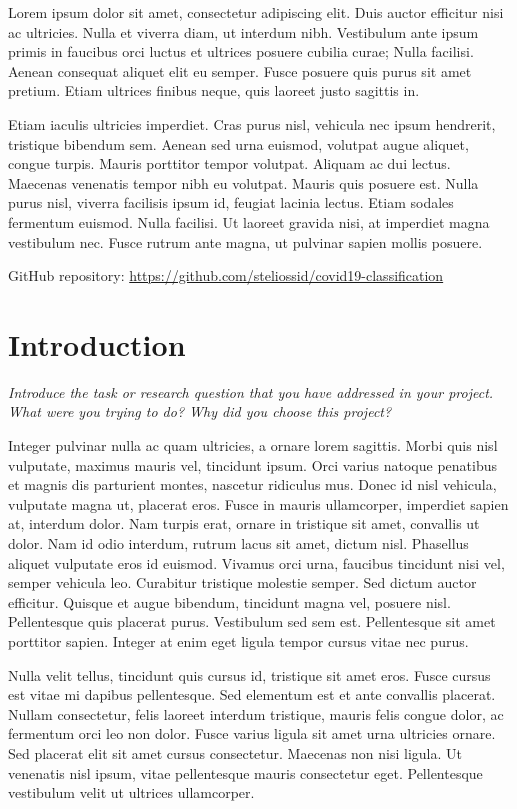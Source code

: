 \documentclass[
]{article}
\begin{document}
Lorem ipsum dolor sit amet, consectetur adipiscing elit. Duis auctor
efficitur nisi ac ultricies. Nulla et viverra diam, ut interdum nibh.
Vestibulum ante ipsum primis in faucibus orci luctus et ultrices posuere
cubilia curae; Nulla facilisi. Aenean consequat aliquet elit eu semper.
Fusce posuere quis purus sit amet pretium. Etiam ultrices finibus neque,
quis laoreet justo sagittis in.

Etiam iaculis ultricies imperdiet. Cras purus nisl, vehicula nec ipsum
hendrerit, tristique bibendum sem. Aenean sed urna euismod, volutpat
augue aliquet, congue turpis. Mauris porttitor tempor volutpat. Aliquam
ac dui lectus. Maecenas venenatis tempor nibh eu volutpat. Mauris quis
posuere est. Nulla purus nisl, viverra facilisis ipsum id, feugiat
lacinia lectus. Etiam sodales fermentum euismod. Nulla facilisi. Ut
laoreet gravida nisi, at imperdiet magna vestibulum nec. Fusce rutrum
ante magna, ut pulvinar sapien mollis posuere.

GitHub repository:
\url{https://github.com/steliossid/covid19-classification}

\newpage

\hypertarget{introduction}{%
\section{Introduction}\label{introduction}}

\emph{Introduce the task or research question that you have addressed in
your project. What were you trying to do? Why did you choose this
project?}

Integer pulvinar nulla ac quam ultricies, a ornare lorem sagittis. Morbi
quis nisl vulputate, maximus mauris vel, tincidunt ipsum. Orci varius
natoque penatibus et magnis dis parturient montes, nascetur ridiculus
mus. Donec id nisl vehicula, vulputate magna ut, placerat eros. Fusce in
mauris ullamcorper, imperdiet sapien at, interdum dolor. Nam turpis
erat, ornare in tristique sit amet, convallis ut dolor. Nam id odio
interdum, rutrum lacus sit amet, dictum nisl. Phasellus aliquet
vulputate eros id euismod. Vivamus orci urna, faucibus tincidunt nisi
vel, semper vehicula leo. Curabitur tristique molestie semper. Sed
dictum auctor efficitur. Quisque et augue bibendum, tincidunt magna vel,
posuere nisl. Pellentesque quis placerat purus. Vestibulum sed sem est.
Pellentesque sit amet porttitor sapien. Integer at enim eget ligula
tempor cursus vitae nec purus.

Nulla velit tellus, tincidunt quis cursus id, tristique sit amet eros.
Fusce cursus est vitae mi dapibus pellentesque. Sed elementum est et
ante convallis placerat. Nullam consectetur, felis laoreet interdum
tristique, mauris felis congue dolor, ac fermentum orci leo non dolor.
Fusce varius ligula sit amet urna ultricies ornare. Sed placerat elit
sit amet cursus consectetur. Maecenas non nisi ligula. Ut venenatis nisl
ipsum, vitae pellentesque mauris consectetur eget. Pellentesque
vestibulum velit ut ultrices ullamcorper.
\end{document}
